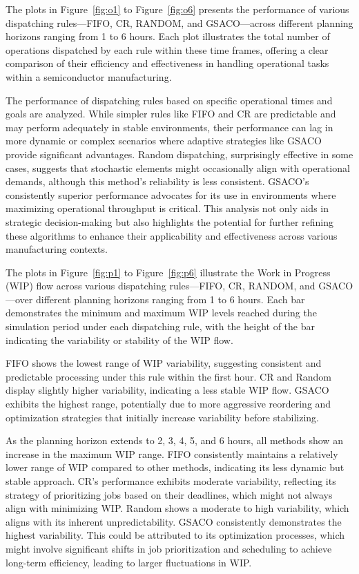 \documentclass[runningheads]{llncs}
\begin{document}
The plots in Figure~\ref{fig:o1} to Figure~\ref{fig:o6} presents the performance of various dispatching rules—FIFO, CR, RANDOM, and GSACO—across different planning horizons ranging from 1 to 6 hours. Each plot illustrates the total number of operations dispatched by each rule within these time frames, offering a clear comparison of their efficiency and effectiveness in handling operational tasks within a semiconductor manufacturing.

The performance of dispatching rules based on specific operational times and goals are analyzed. While simpler rules like FIFO and CR are predictable and may perform adequately in stable environments, their performance can lag in more dynamic or complex scenarios where adaptive strategies like GSACO provide significant advantages. Random dispatching, surprisingly effective in some cases, suggests that stochastic elements might occasionally align with operational demands, although this method’s reliability is less consistent. GSACO’s consistently superior performance advocates for its use in environments where maximizing operational throughput is critical. This analysis not only aids in strategic decision-making but also highlights the potential for further refining these algorithms to enhance their applicability and effectiveness across various manufacturing contexts.

The plots in Figure~\ref{fig:p1} to Figure~\ref{fig:p6} illustrate the Work in Progress (WIP) flow across various dispatching rules—FIFO, CR, RANDOM, and GSACO —over different planning horizons ranging from 1 to 6 hours. Each bar demonstrates the minimum and maximum WIP levels reached during the simulation period under each dispatching rule, with the height of the bar indicating the variability or stability of the WIP flow.

FIFO shows the lowest range of WIP variability, suggesting consistent and predictable processing under this rule within the first hour. CR and Random display slightly higher variability, indicating a less stable WIP flow.
GSACO exhibits the highest range, potentially due to more aggressive reordering and optimization strategies that initially increase variability before stabilizing.

As the planning horizon extends to 2, 3, 4, 5, and 6 hours, all methods show an increase in the maximum WIP range. FIFO consistently maintains a relatively lower range of WIP compared to other methods, indicating its less dynamic but stable approach.
CR's performance exhibits moderate variability, reflecting its strategy of prioritizing jobs based on their deadlines, which might not always align with minimizing WIP.
Random shows a moderate to high variability, which aligns with its inherent unpredictability.
GSACO consistently demonstrates the highest variability. This could be attributed to its optimization processes, which might involve significant shifts in job prioritization and scheduling to achieve long-term efficiency, leading to larger fluctuations in WIP.
\end{document}
